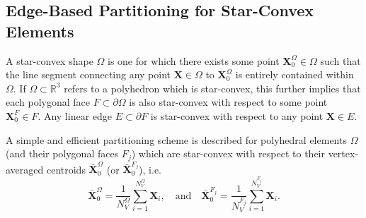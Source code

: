 \subsection*{Edge-Based Partitioning for Star-Convex Elements}

	A star-convex shape $\Omega$ is one for which there exists some point $\mathbf{X}^{\Omega}_0 \in \Omega$ such that the line segment connecting any point $\mathbf{X} \in \Omega$ to $\mathbf{X}^{\Omega}_0$ is entirely contained within $\Omega$. If $\Omega \subset \mathbb{R}^3$ refers to a polyhedron which is star-convex, this further implies that each polygonal face $F \subset \partial \Omega$ is also star-convex with respect to some point $\mathbf{X}^{F}_0 \in F$. Any linear edge $E \subset \partial F$ is star-convex with respect to any point $\mathbf{X} \in E$.
	
	A simple and efficient partitioning scheme is described for polyhedral elements $\Omega$ (and their polygonal faces $F_j$) which are star-convex with respect to their vertex-averaged centroids $\bar{\mathbf{X}}^{\Omega}_0$ (or $\bar{\mathbf{X}}^{F_j}_0$), i.e.
	\begin{equation}
		\bar{\mathbf{X}}^{\Omega}_0 = \frac{1}{N^{\Omega}_V} \sum_{i = 1}^{N^{\Omega}_V} \mathbf{X}_{i}, \quad \text{and} \quad \bar{\mathbf{X}}^{F_j}_0 = \frac{1}{N^{F_j}_V} \sum_{i = 1}^{N^{F_j}_V} \mathbf{X}_{i}.
	\end{equation}
	
